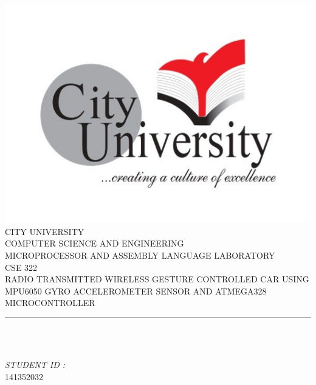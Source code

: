 \documentclass[12pt]{article}
\makeatletter
\let\thetitle\@title
\makeatother
\begin{document}

\begin{titlepage}
	\centering
    \vspace*{0.5 cm}
    \includegraphics[scale = 0.35]{City-Logo.jpg}\\[1.0 cm]	%
    \textsc{\LARGE CITY UNIVERSITY}\\[2.0 cm]
    \textsc{\lARGE COMPUTER SCIENCE AND ENGINEERING}\\[0.2 cm]
    \textsc{\lARGE MICROPROCESSOR AND ASSEMBLY LANGUAGE LABORATORY}\\[0.2 cm]
	\textsc{\Large CSE 322}\\[0.5 cm]				%
	\textsc{\large RADIO TRANSMITTED WIRELESS GESTURE CONTROLLED  CAR USING MPU6050 GYRO ACCELEROMETER SENSOR AND ATMEGA328 MICROCONTROLLER }\\[0.2 cm]
	\rule{\linewidth}{0.2 mm} \\[0.4 cm]
	{ \huge \bfseries \thetitle}\\
	
	
	\begin{minipage}{0.4\textwidth}
		
			\begin{flushright} 
			\emph{STUDENT ID :} \\
			141352032
		\end{flushright}
	\end{minipage}\\[2 cm]
	

 
	\vfill
	
\end{titlepage}
\end{document}
